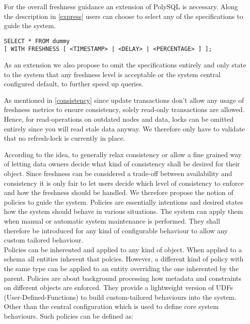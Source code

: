 For the overall freshness guidance an extension of PolySQL is necessary.
Along the description in \ref{express} users can choose to select any of the specifications to guide the system.
\begin{verbatim}
SELECT * FROM dummy 
[ WITH FRESHNESS [ <TIMESTAMP> | <DELAY> | <PERCENTAGE> ] ];
\end{verbatim}
As an extension we also propose to omit the specifications entirely and only state to the system that any freshness level is acceptable or the system central
configured default, to further speed up queries.



As mentioned in \ref{consistency} since update transactions don't allow any usage of freshness metrics to ensure consistency, solely read-only transactions are allowed.
Hence, for read-operations on outdated nodes and data, locks can be omitted entirely since you will read stale data anyway.
We therefore only have to validate that no refresh-lock is currently in place.





\label{sec:polcies}

According to the idea, to generally relax consistency or allow a fine grained way of letting data owners decide what kind of consistency shall be desired for their object. 
Since freshness can be considered a trade-off between availability and consistency it is only fair to let users decide which level of consistency to enforce and 
how the freshness should be handled. We therefore propose the notion of policies to guide the system.
Policies are essentially intentions and desired states how the system should behave in various situations. 
The system can apply them when manual or automatic system maintenance is performed.
They shall therefore be introduced for any kind of configurable behaviour to allow any custom tailored behaviour. \\

Policies can be inherented and applied to any kind of object. When applied to a schema all entities inherent that polcies.
However, a different kind of policy with the same type can be applied to an entity overriding the one inherented by the parent.
Policies are about background processing how metadata and constraints on different objects are enforced. 
They provide a lightweight version of UDFs (User-Defined-Functions) to build custom-tailored behaviours into the system.
Other than the central configuration which is used to define core system behaviours. 
Such policies can be defined as:\\



